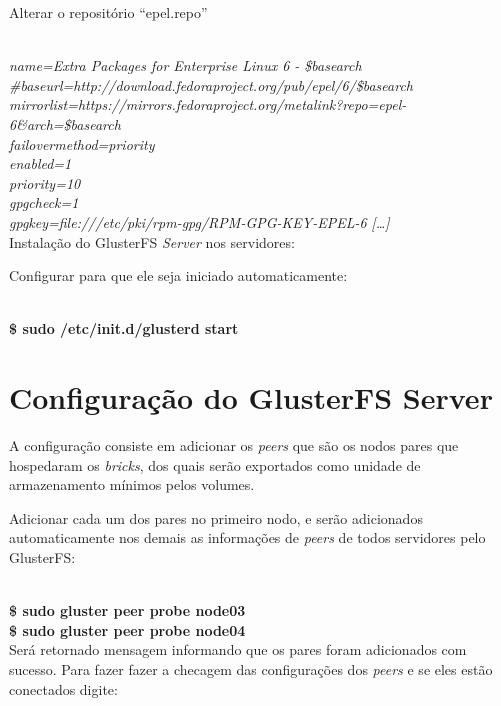 {Alterar o repositório “epel.repo”


\noindent{\textit{[epel]}} \\
\textit{name=Extra Packages for Enterprise Linux 6 - \$basearch} \\
\textit{\#baseurl=http://download.fedoraproject.org/pub/epel/6/\$basearch} \\
\textit{mirrorlist=https://mirrors.fedoraproject.org/metalink?repo=epel-6\&arch=\$basearch} \\ 
\textit{failovermethod=priority} \\
\textit{enabled=1} \\
\textit{priority=10} \\
\textit{gpgcheck=1} \\
\textit{gpgkey=file:///etc/pki/rpm-gpg/RPM-GPG-KEY-EPEL-6}
\textit{[…]} \\

Instalação do GlusterFS \textit{Server} nos servidores:


Configurar para que ele seja iniciado automaticamente:

\\
\textbf{\$ sudo /etc/init.d/glusterd start}

\section*{Configuração do GlusterFS Server}

A configuração consiste em adicionar os \textit{peers} que são os nodos pares que hospedaram os \textit{bricks}, 
dos quais serão exportados como unidade de armazenamento mínimos pelos volumes.

Adicionar cada um dos pares no primeiro nodo, e serão adicionados automaticamente nos demais as informações de 
\textit{peers} de todos servidores pelo GlusterFS:

 \\
\textbf{\$ sudo gluster peer probe node03} \\
\textbf{\$ sudo gluster peer probe node04} \\

Será retornado mensagem informando que os pares foram adicionados com sucesso. Para fazer fazer a 
checagem das configurações dos \textit{peers} e se eles estão conectados digite:

}

